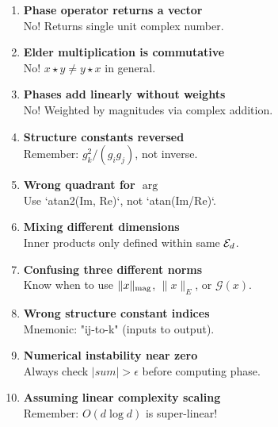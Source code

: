 \begin{tcolorbox}[colback=red!10!white,colframe=red!75!black,title=Top 10 Mistakes to Avoid]

\begin{enumerate}
\item \textbf{Phase operator returns a vector} \\ 
      No! Returns single unit complex number.

\item \textbf{Elder multiplication is commutative} \\
      No! $x \star y \neq y \star x$ in general.

\item \textbf{Phases add linearly without weights} \\
      No! Weighted by magnitudes via complex addition.

\item \textbf{Structure constants reversed} \\
      Remember: $g_k^2/(g_ig_j)$, not inverse.

\item \textbf{Wrong quadrant for $\arg$} \\
      Use `atan2(Im, Re)`, not `atan(Im/Re)`.

\item \textbf{Mixing different dimensions} \\
      Inner products only defined within same $\mathcal{E}_{d}$.

\item \textbf{Confusing three different norms} \\
      Know when to use $\|x\|_{\text{mag}}$, $\|x\|_E$, or $\mathcal{G}(x)$.

\item \textbf{Wrong structure constant indices} \\
      Mnemonic: "ij-to-k" (inputs to output).

\item \textbf{Numerical instability near zero} \\
      Always check $|sum| > \epsilon$ before computing phase.

\item \textbf{Assuming linear complexity scaling} \\
      Remember: $O(d \log d)$ is super-linear!
\end{enumerate}

\end{tcolorbox}

